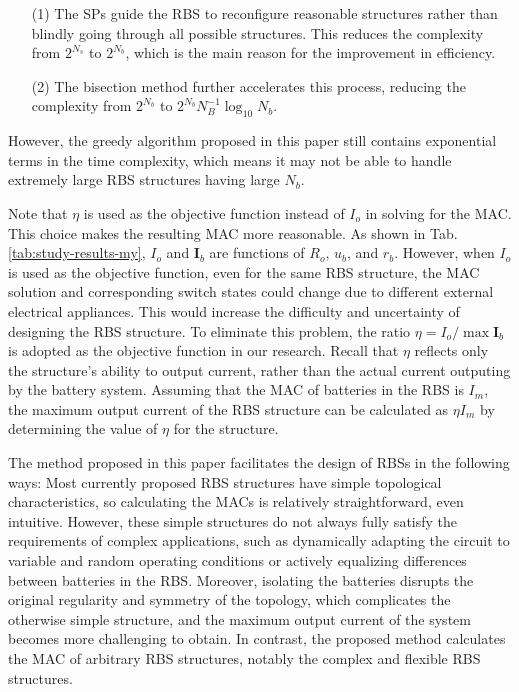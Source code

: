 \documentclass{article}
\begin{document}
\begin{enumerate}
\item[(1)] The SPs guide the RBS to reconfigure reasonable structures rather than blindly going through all possible structures. This reduces the complexity from $2^{N_s}$ to $2^{N_b}$, which is the main reason for the improvement in efficiency.
\item[(2)] The bisection method further accelerates this process, reducing the complexity from $2^{N_b}$ to $2^{N_b} N_B^{-1} \log_{10} N_b$.
\end{enumerate}
However, the greedy algorithm proposed in this paper still contains exponential terms in the time complexity, which means it may not be able to handle extremely large RBS structures having large $N_b$.


Note that $\eta$ is used as the objective function instead of $I_o$ in solving for the MAC. 
This choice makes the resulting MAC more reasonable. 
As shown in Tab. \ref{tab:study-results-my}, $I_o$ and $\bm{I}_b$ are functions of $R_o$, $u_b$, and $r_b$. 
However, when $I_o$ is used as the objective function, even for the same RBS structure, the MAC solution and corresponding switch states could change due to different external electrical appliances.
This would increase the difficulty and uncertainty of designing the RBS structure. 
To eliminate this problem, the ratio $\eta=I_o/\max\bm{I}_b$ is adopted as the objective function in our research.
Recall that $\eta$ reflects only the structure's ability to output current, rather than the actual current outputing by the battery system.
Assuming that the MAC of batteries in the RBS is $I_m$, the maximum output current of the RBS structure can be calculated as $\eta I_m$ by determining the value of $\eta$ for the structure. 


The method proposed in this paper facilitates the design of RBSs in the following ways:
Most currently proposed RBS structures \cite{ciNovelDesignAdaptive2007,alahmadBatterySwitchArray2008,kimDependableEfficientScalable2010b,kimBalancedReconfigurationStorage2011a,taesickimSeriesconnectedSelfreconfigurableMulticell2012a,6843711} have simple topological characteristics, so calculating the MACs is relatively straightforward, even intuitive.
However, these simple structures do not always fully satisfy the requirements of complex applications, such as dynamically adapting the circuit to variable and random operating conditions or actively equalizing differences between batteries in the RBS.
Moreover, isolating the batteries disrupts the original regularity and symmetry of the topology, which complicates the otherwise simple structure, and the maximum output current of the system becomes more challenging to obtain.
In contrast, the proposed method calculates the MAC of arbitrary RBS structures, notably the complex and flexible RBS structures.
\end{document}
